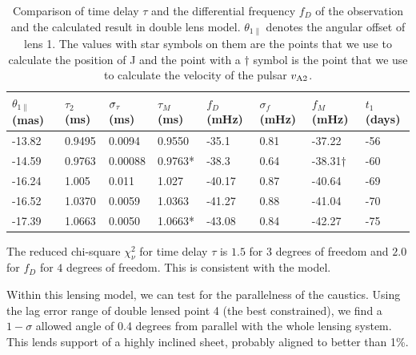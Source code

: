 \documentclass[useAMS,usenatbib]{mn2e}
\begin{document}
\begin{table}
\centering
\begin{tabular}{llllllll}
\hline
$\theta_{1\parallel}$ (mas)  & $\tau_2$(ms) & $\sigma_{\rm \tau}$(ms)  & $\tau_M$(ms) & $f_D$(mHz)  &$\sigma_{f}$(mHz)      &  $f_M$(mHz)& $t_1$(days) \\ \hline
-13.82  &    0.9495     &0.0094    & 0.9550       & -35.1     &0.81    & -37.22          & -56\\ 
-14.59  &   0.9763    &0.00088   & 0.9763*       & -38.3     &0.64    & -38.31$\dagger$ & -60\\ 
-16.24  &   1.005    &0.011   & 1.027          & -40.17    &0.87   & -40.64          & -69\\ 
-16.52  &    1.0370     &0.0059    & 1.0363       & -41.27    &0.88   & -41.04          & -70\\ 
-17.39  &  1.0663     &0.0050    & 1.0663*        & -43.08    &0.84   & -42.27           & -75\\ \hline
\end{tabular}
\caption{Comparison of time delay $\tau$ and the differential frequency $f_D$ of the observation and the calculated result in double lens model. $\theta_{1\parallel}$ denotes the angular offset of lens 1. 
The values with star symbols on them are the points that we use to calculate the position of J and the point with a $\dagger$ symbol is the point that we use to calculate the velocity of the pulsar $v_{\rm A2}$. }
\label{table:double_lens_compare}
\end{table}



The reduced chi-square ${\chi}^2_{\nu}$ for time delay $\tau$ is $1.5$
for $3$ degrees of freedom
and $2.0$ for $f_D$ for $4$ degrees of freedom.  This is consistent
with the model.


Within this lensing model, we can test for the parallelness of the
caustics.  Using the lag error range of double lensed point 4 (the best
constrained), we find a $1-\sigma$ allowed angle of 0.4 degrees from
parallel with the whole lensing system.  This lends support of a
highly inclined sheet, probably aligned to better than 1\%.
\end{document}
